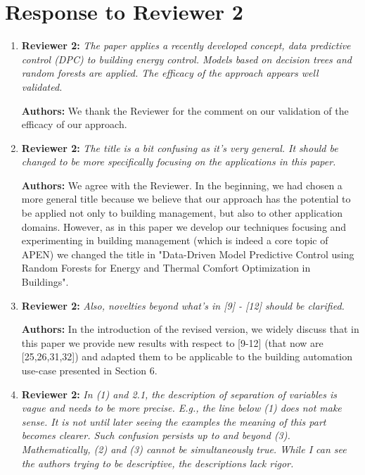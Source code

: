 \documentclass{article}
\begin{document}
\section{Response to Reviewer 2}



\begin{enumerate}



\item \textbf{Reviewer 2:} \textit{The paper applies a recently developed concept, data predictive control (DPC) to building energy control. Models based on decision trees and random forests are applied. The efficacy of the approach appears well validated.}



\textbf{Authors:} We thank the Reviewer for the comment on our validation of the efficacy of our approach.



\item \textbf{Reviewer 2:} \textit{The title is a bit confusing as it's very general. It should be changed to be more specifically focusing on the applications in this paper.}



\textbf{Authors:} We agree with the Reviewer. In the beginning, we had chosen a more general title because we believe that our approach has the potential to be applied not only to building management, but also to other application domains. However, as in this paper we develop our techniques focusing and experimenting in building management (which is indeed a core topic of APEN) we changed the title in "Data-Driven Model Predictive Control using Random Forests for Energy and Thermal Comfort Optimization in Buildings". 



\item \textbf{Reviewer 2:} \textit{Also, novelties beyond what's in [9] - [12] should be clarified.}



\textbf{Authors:} In the introduction of the revised version, we widely discuss that in this paper we provide new results with respect to [9-12] (that now are [25,26,31,32]) and adapted them to be applicable to the building automation use-case presented in Section 6.



\item \textbf{Reviewer 2:} \textit{In (1) and 2.1, the description of separation of variables is vague and needs to be more precise. E.g., the line below (1) does not make sense. It is not until later seeing the examples the meaning of this part becomes clearer. Such confusion persists up to and beyond (3). Mathematically, (2) and (3) cannot be simultaneously true. While I can see the authors trying to be descriptive, the descriptions lack rigor.} 




\end{enumerate}
\end{document}
